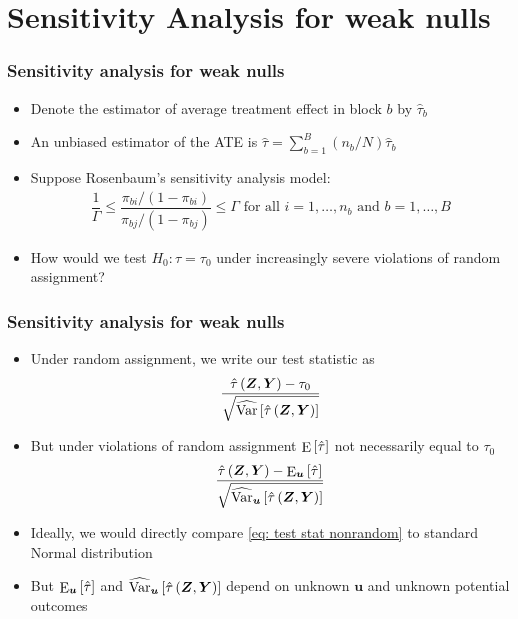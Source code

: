\documentclass[table, xcolor = {dvipsnames}, 9pt]{beamer}
\theoremstyle{plain}
\DeclareMathOperator{\E}{\rm{E}}
\DeclareMathOperator{\Var}{\rm{Var}}
\begin{document}
\section{Sensitivity Analysis for weak nulls}
\begin{frame}
\frametitle{Sensitivity analysis for weak nulls} 
\vfill
\begin{itemize} \vfill
\item Denote the estimator of average treatment effect in block $b$ by $\hat{\tau}_b$ \vfill
\item An unbiased estimator of the ATE is $\hat{\tau} = \sum \limits_{b = 1}^B (n_b/N)\hat{\tau}_b$ \vfill
\item Suppose Rosenbaum's sensitivity analysis model: \vfill
\begin{align*}
\dfrac{1}{\Gamma} \leq \dfrac{\pi_{bi}/(1 - \pi_{bi})}{\pi_{bj} / (1 - \pi_{bj})} \leq \Gamma \text{ for all } i = 1, \ldots , n_b \text{ and } b = 1, \ldots , B 
\end{align*} \vfill
\item How would we test $H_0: \tau = \tau_0$ under increasingly severe violations of random assignment? \vfill
\end{itemize}  
\vfill
\end{frame}
\begin{frame}[t]
\frametitle{Sensitivity analysis for weak nulls} 
\vfill
\begin{itemize} \vfill
\item Under random assignment, we write our test statistic as \vfill
\begin{align*}
\frac{\hat{\tau}\left(\bm{Z}, \bm{Y}\right) - \tau_0}{\sqrt{\widehat{\Var}\left[\hat{\tau}\left(\bm{Z}, \bm{Y}\right)\right]}}
\end{align*} \vfill
\item But under violations of random assignment $\E\left[\hat{\tau}\right]$ not necessarily equal to $\tau_0$ \vfill
\begin{align} \label{eq: test stat nonrandom}
\frac{\hat{\tau}\left(\bm{Z}, \bm{Y}\right) - \E_{\bm{u}}\left[\hat{\tau}\right]}{\sqrt{\widehat{\Var}_{\bm{u}}\left[\hat{\tau}\left(\bm{Z}, \bm{Y}\right)\right]}}
\end{align} \vfill
\item Ideally, we would directly compare \eqref{eq: test stat nonrandom} to standard Normal distribution \vfill
\item But $\E_{\bm{u}}\left[\hat{\tau}\right]$ and $\widehat{\Var}_{\bm{u}}\left[\hat{\tau}\left(\bm{Z}, \bm{Y}\right)\right]$ depend on unknown $\bm{u}$ and unknown potential outcomes
\end{itemize}  
\vfill
\end{frame}
\end{document}
